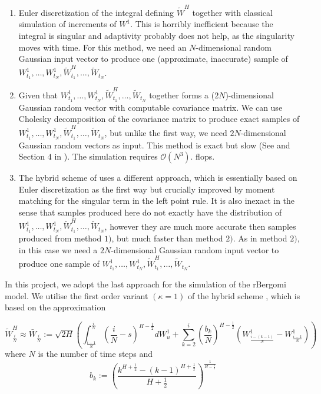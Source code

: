 \documentclass[11pt]{article}
\newcommand{\Ordo}[1]{{\mathcal{O}}\left(#1\right)}
\begin{document}
 \begin{enumerate}
 	\item Euler discretization of the integral defining $\tilde{W}^H$ together with classical simulation of increments of $W^1$. This is horribly inefficient because the integral is singular and adaptivity probably does not help, as the singularity moves with time. For this 	method, we need an $N$-dimensional random Gaussian input vector to produce one (approximate, inaccurate) sample of $W^1_{t_1},\dots, W^1_{t_N}, \tilde{W}^H_{t_1},\dots, \tilde{W}_{t_N}$.
 	
 	\item Given that $W^1_{t_1},\dots, W^1_{t_N}, \tilde{W}^H_{t_1},\dots, \tilde{W}_{t_N}$ together forms a ($2N$)-dimensional Gaussian random vector with computable covariance matrix. We can use Cholesky decomposition of the covariance matrix to produce exact samples of $W^1_{t_1},\dots, W^1_{t_N}, \tilde{W}^H_{t_1},\dots, \tilde{W}_{t_N}$, but unlike the first way, we need $2N$-dimensional Gaussian random vectors as
 	input. This method is exact but slow (See  \cite{bayer2016pricing} and Section $4$ in \cite{bayer2017short} ). The simulation  requires $\Ordo{N^3}$. flops. 
 	
 	\item  The hybrid scheme of \cite{bennedsen2017hybrid} uses a different approach, which is essentially based on  Euler discretization as the first way but crucially improved by moment
 	matching for the singular term in the left point rule. It is also
 	inexact in the sense that samples produced here do not exactly have the distribution of $W^1_{t_1},\dots, W^1_{t_N}, \tilde{W}^H_{t_1},\dots, \tilde{W}_{t_N}$, however they are much more accurate then samples produced from method $1)$, but much faster than method $2)$. As in method $2)$, in this case we need a $2N$-dimensional Gaussian random input vector to produce one
 	sample of $W^1_{t_1},\dots, W^1_{t_N}, \tilde{W}^H_{t_1},\dots, \tilde{W}_{t_N}$.
 \end{enumerate}
In this project, we adopt the last approach for the simulation of the rBergomi model. We utilise the first order variant $(\kappa=1) $ of the hybrid scheme \cite{bennedsen2017hybrid}, which is based on the approximation

\begin{equation}\label{eq:Hybrid_scheme}
\tilde{W}^H_{\frac{i}{N}} \approx \bar{W}_{\frac{i}{N}}:= \sqrt{2H} \left(\int_{\frac{i-1}{N}}^{\frac{i}{N}} \left(\frac{i}{N} -s\right)^{H-\frac{1}{2}} dW_u^1+\sum_{k=2}^{i} \left(\frac{b_k}{N}\right)^{H-\frac{1}{2}} \left(W_{\frac{i-(k-1)}{N}}^1-W_{\frac{i-k}{N}}^1\right)\right)
\end{equation}
where $N$ is the number of time steps and 
$$ b_k:=\left(\frac{k^{H+\frac{1}{2}}-(k-1)^{H+\frac{1}{2} }}{H+\frac{1}{2}}\right)^{\frac{1}{H-\frac{1}{2}}}$$
\end{document}

